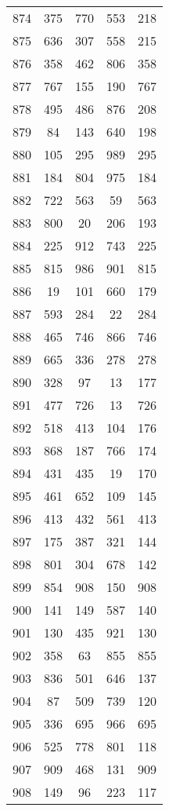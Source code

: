 \documentclass[a4paper,10pt,ngerman]{scrartcl}
\begin{document}
\begin{longtable}[c]{c|c|c|c|c}
    874 & 375 & 770 & 553 & 218 \\
    875 & 636 & 307 & 558 & 215 \\
    876 & 358 & 462 & 806 & 358 \\
    877 & 767 & 155 & 190 & 767 \\
    878 & 495 & 486 & 876 & 208 \\
    879 & 84 & 143 & 640 & 198 \\
    880 & 105 & 295 & 989 & 295 \\
    881 & 184 & 804 & 975 & 184 \\
    882 & 722 & 563 & 59 & 563 \\
    883 & 800 & 20 & 206 & 193 \\
    884 & 225 & 912 & 743 & 225 \\
    885 & 815 & 986 & 901 & 815 \\
    886 & 19 & 101 & 660 & 179 \\
    887 & 593 & 284 & 22 & 284 \\
    888 & 465 & 746 & 866 & 746 \\
    889 & 665 & 336 & 278 & 278 \\
    890 & 328 & 97 & 13 & 177 \\
    891 & 477 & 726 & 13 & 726 \\
    892 & 518 & 413 & 104 & 176 \\
    893 & 868 & 187 & 766 & 174 \\
    894 & 431 & 435 & 19 & 170 \\
    895 & 461 & 652 & 109 & 145 \\
    896 & 413 & 432 & 561 & 413 \\
    897 & 175 & 387 & 321 & 144 \\
    898 & 801 & 304 & 678 & 142 \\
    899 & 854 & 908 & 150 & 908 \\
    900 & 141 & 149 & 587 & 140 \\
    901 & 130 & 435 & 921 & 130 \\
    902 & 358 & 63 & 855 & 855 \\
    903 & 836 & 501 & 646 & 137 \\
    904 & 87 & 509 & 739 & 120 \\
    905 & 336 & 695 & 966 & 695 \\
    906 & 525 & 778 & 801 & 118 \\
    907 & 909 & 468 & 131 & 909 \\
    908 & 149 & 96 & 223 & 117 \\

\end{longtable}
\end{document}
